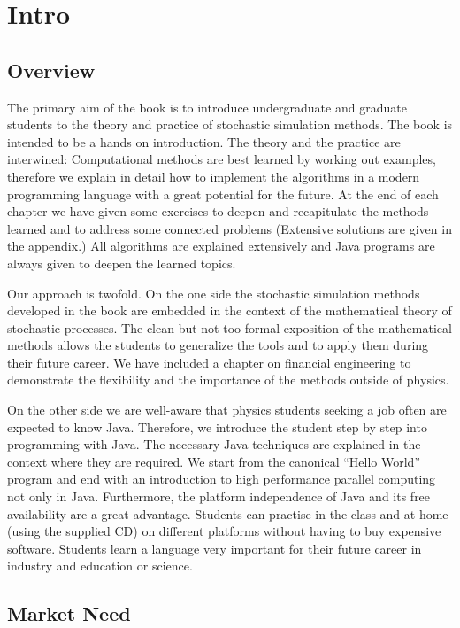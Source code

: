 \documentclass[a4paper]{book}
\begin{document}
\chapter*{Intro}

\section*{Overview}

The primary aim of the book is to introduce undergraduate and graduate 
students to the theory and practice of stochastic simulation methods.
The book is intended to be a  hands on introduction. 
The theory and the practice are interwined:  Computational methods are 
best learned by working out examples, therefore we explain in detail how to 
implement the algorithms in a modern programming language with a great 
potential for the future. At the end of each chapter we have given
some exercises to deepen and recapitulate the methods learned and to
address some connected problems (Extensive 
solutions are given in the appendix.)
All algorithms are explained extensively and 
Java programs are always given to deepen the learned topics.

Our approach is twofold. On the one side the  stochastic simulation
methods developed in the book are embedded in the context of the
mathematical theory of stochastic processes. The clean but not too formal 
exposition of the mathematical methods allows
the students to generalize the tools and to apply them during their future 
career. We have included a chapter on financial engineering to
demonstrate the flexibility and the importance of the methods outside of
physics. 

On the other side we are well-aware that physics students seeking a
job often are expected to know Java.  Therefore, we introduce the
student step by step into programming with Java. The necessary Java
techniques are explained in the context where they are required.
We start from the canonical ``Hello World'' program and end with an 
introduction to high performance parallel computing not only in Java.
Furthermore, the platform independence of Java and its free
availability are  a great advantage. Students can practise in the class 
and at home (using the supplied CD) on 
different platforms without having to buy expensive
software. Students learn a language very important for 
their future career in industry and education or science.



\section*{Market Need}
\end{document}
